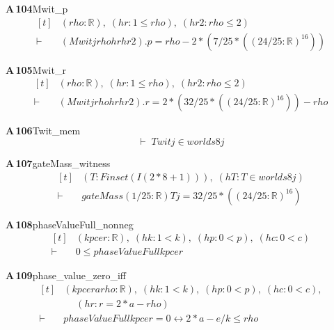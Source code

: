 \documentclass[conference]{IEEEtran}
\theoremstyle{definition}
\newcommand{\lean}[1]{\textsf{\footnotesize #1}}
\begin{document}
\noindent\textbf{A\,104}\quad\lean{Mwit\_p}
{\footnotesize\[ \begin{aligned}[t]
&(\mathit{rho} : \mathbb{R} ),\; (\mathit{hr} : 1 \leq \mathit{rho}),\; (\mathit{hr2} : \mathit{rho} \leq 2)\\
\vdash\;&(\mathit{Mwit} \mathit{j} \mathit{rho} \mathit{hr} \mathit{hr2}).\mathit{p} = \mathit{rho}-2*(7/25*((24/25:\mathbb{R} )^{16}))
\end{aligned} \]}

\noindent\textbf{A\,105}\quad\lean{Mwit\_r}
{\footnotesize\[ \begin{aligned}[t]
&(\mathit{rho} : \mathbb{R} ),\; (\mathit{hr} : 1 \leq \mathit{rho}),\; (\mathit{hr2} : \mathit{rho} \leq 2)\\
\vdash\;&(\mathit{Mwit} \mathit{j} \mathit{rho} \mathit{hr} \mathit{hr2}).\mathit{r} = 2*(32/25*((24/25:\mathbb{R} )^{16}))-\mathit{rho}
\end{aligned} \]}

\noindent\textbf{A\,106}\quad\lean{Twit\_mem}
{\footnotesize\[ \vdash\; \mathit{Twit} \mathit{j} \in \mathit{worlds} 8 \mathit{j} \]}

\noindent\textbf{A\,107}\quad\lean{gateMass\_witness}
{\footnotesize\[ \begin{aligned}[t]
&(\mathit{T} : \mathit{Finset} (\mathit{I} (2*8+1))),\; (\mathit{hT} : \mathit{T} \in \mathit{worlds} 8 \mathit{j})\\
\vdash\;&\mathit{gateMass} (1/25 : \mathbb{R} ) \mathit{T} \mathit{j} = 32/25*((24/25:\mathbb{R} )^{16})
\end{aligned} \]}

\noindent\textbf{A\,108}\quad\lean{phaseValueFull\_nonneg}
{\footnotesize\[ \begin{aligned}[t]
&(\mathit{k} \mathit{p} \mathit{c} \mathit{e} \mathit{r} : \mathbb{R} ),\; (\mathit{hk} : 1 < \mathit{k}),\; (\mathit{hp} : 0 < \mathit{p}),\; (\mathit{hc} : 0 < \mathit{c})\\
\vdash\;&0 \leq \mathit{phaseValueFull} \mathit{k} \mathit{p} \mathit{c} \mathit{e} \mathit{r}
\end{aligned} \]}

\noindent\textbf{A\,109}\quad\lean{phase\_value\_zero\_iff}
{\footnotesize\[ \begin{aligned}[t]
&(\mathit{k} \mathit{p} \mathit{c} \mathit{e} \mathit{r} \mathit{a} \mathit{rho} : \mathbb{R} ),\; (\mathit{hk} : 1 < \mathit{k}),\; (\mathit{hp} : 0 < \mathit{p}),\; (\mathit{hc} : 0 < \mathit{c}),\\
&\quad \; (\mathit{hr} : \mathit{r} = 2*\mathit{a}-\mathit{rho})\\
\vdash\;&\mathit{phaseValueFull} \mathit{k} \mathit{p} \mathit{c} \mathit{e} \mathit{r} = 0 \leftrightarrow 2*\mathit{a}-\mathit{e}/\mathit{k} \leq \mathit{rho}
\end{aligned} \]}
\end{document}
